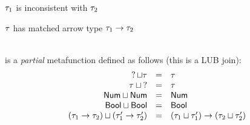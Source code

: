 \documentclass{article}
\begin{document}
 $\TMV_1$ is inconsistent with $\TMV_2$
%
\begin{mathpar}





\end{mathpar}

 $\TMV$ has matched arrow type $\TArrow{\TMV_1}{\TMV_2}$
%
\begin{mathpar}

\end{mathpar} \\

 is a \emph{partial} metafunction defined as
follows (this is a LUB join):
%
\newcommand{\joinsTo}[3]{\ensuremath{\TJoin{#1}{#2} & = & #3}}
\[\begin{array}{rcl}
  \joinsTo{\TUnknown}{\TMV}{\TMV} \\
  \joinsTo{\TMV}{\TUnknown}{\TMV} \\
  \joinsTo{\TNum}{\TNum}{\TNum} \\
  \joinsTo{\TBool}{\TBool}{\TBool} \\
  \joinsTo{(\TArrow{\TMV_1}{\TMV_2})}{(\TArrow{\TMV_1'}{\TMV_2'})}{\TArrow{(\TJoin{\TMV_1}{\TMV_1'})}{(\TJoin{\TMV_2}{\TMV_2'})}} \\
\end{array}\]
\end{document}
